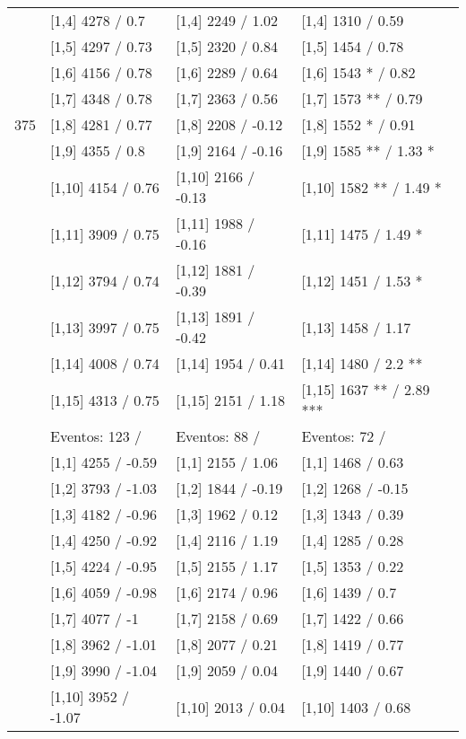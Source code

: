 \begin{table}
\begin{tabular}[t]{llll}
\addlinespace
 & {}[1,4] 4278  / 0.7 & {}[1,4] 2249  / 1.02 & {}[1,4] 1310  / 0.59\\
 & {}[1,5] 4297  / 0.73 & {}[1,5] 2320  / 0.84 & {}[1,5] 1454  / 0.78\\
 & {}[1,6] 4156  / 0.78 & {}[1,6] 2289  / 0.64 & {}[1,6] 1543 * / 0.82\\
 & {}[1,7] 4348  / 0.78 & {}[1,7] 2363  / 0.56 & {}[1,7] 1573 ** / 0.79\\
375 & {}[1,8] 4281  / 0.77 & {}[1,8] 2208  / -0.12 & {}[1,8] 1552 * / 0.91\\
\addlinespace
 & {}[1,9] 4355  / 0.8 & {}[1,9] 2164  / -0.16 & {}[1,9] 1585 ** / 1.33 *\\
 & {}[1,10] 4154  / 0.76 & {}[1,10] 2166  / -0.13 & {}[1,10] 1582 ** / 1.49 *\\
 & {}[1,11] 3909  / 0.75 & {}[1,11] 1988  / -0.16 & {}[1,11] 1475  / 1.49 *\\
 & {}[1,12] 3794  / 0.74 & {}[1,12] 1881  / -0.39 & {}[1,12] 1451  / 1.53 *\\
 & {}[1,13] 3997  / 0.75 & {}[1,13] 1891  / -0.42 & {}[1,13] 1458  / 1.17\\
\addlinespace
 & {}[1,14] 4008  / 0.74 & {}[1,14] 1954  / 0.41 & {}[1,14] 1480  / 2.2 **\\
 & {}[1,15] 4313  / 0.75 & {}[1,15] 2151  / 1.18 & {}[1,15] 1637 ** / 2.89 ***\\
 & Eventos:  123 / & Eventos:  88 / & Eventos:  72 /\\
 & {}[1,1] 4255  / -0.59 & {}[1,1] 2155  / 1.06 & {}[1,1] 1468  / 0.63\\
 & {}[1,2] 3793  / -1.03 & {}[1,2] 1844  / -0.19 & {}[1,2] 1268  / -0.15\\
\addlinespace
 & {}[1,3] 4182  / -0.96 & {}[1,3] 1962  / 0.12 & {}[1,3] 1343  / 0.39\\
 & {}[1,4] 4250  / -0.92 & {}[1,4] 2116  / 1.19 & {}[1,4] 1285  / 0.28\\
 & {}[1,5] 4224  / -0.95 & {}[1,5] 2155  / 1.17 & {}[1,5] 1353  / 0.22\\
 & {}[1,6] 4059  / -0.98 & {}[1,6] 2174  / 0.96 & {}[1,6] 1439  / 0.7\\
 & {}[1,7] 4077  / -1 & {}[1,7] 2158  / 0.69 & {}[1,7] 1422  / 0.66\\
\addlinespace
500 & {}[1,8] 3962  / -1.01 & {}[1,8] 2077  / 0.21 & {}[1,8] 1419  / 0.77\\
 & {}[1,9] 3990  / -1.04 & {}[1,9] 2059  / 0.04 & {}[1,9] 1440  / 0.67\\
 & {}[1,10] 3952  / -1.07 & {}[1,10] 2013  / 0.04 & {}[1,10] 1403  / 0.68\\

\end{tabular}
\end{table}
